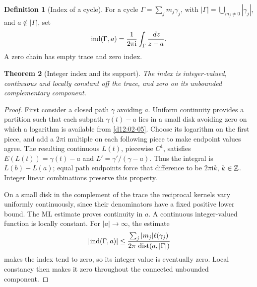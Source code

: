 \documentclass[11pt,a4paper,openany]{book}
\newtheorem{theorem}{Theorem}[chapter]
\theoremstyle{definition}
\newtheorem{definition}[theorem]{Definition}
\theoremstyle{remark}\newtheorem{remark}[theorem]{Remark}
\newcommand{\dd}{\,d}\newcommand{\iu}{\mathrm i}
\DeclareMathOperator{\dist}{dist}\DeclareMathOperator{\ord}{ord}
\newcommand{\family}[1]{}
\begin{document}
\begin{definition}[Index of a cycle]\family{D12.04.03}\label{d12:04-03}
For a cycle \(\Gamma=\sum_jm_j\gamma_j\), with
\(|\Gamma|=\bigcup_{m_j\ne0}|\gamma_j|\), and \(a\notin|\Gamma|\), set
\[
 \ind(\Gamma,a)=\frac1{2\pi\iu}\int_\Gamma\frac{\dd z}{z-a}.
\]
A zero chain has empty trace and zero index.
\end{definition}
\begin{theorem}[Integer index and its support]\label{d12:04-03-properties}
The index is integer-valued, continuous and locally constant off the
trace, and zero on its unbounded complementary component.
\end{theorem}
\begin{proof}
First consider a closed path \(\gamma\) avoiding \(a\).
Uniform continuity provides a partition such that each subpath
\(\gamma(t)-a\) lies in a small disk avoiding zero on which a logarithm
is available from \cref{d12:02-05}. Choose its logarithm on the first
piece, and add a \(2\pi\iu\) multiple on each following piece to make
endpoint values agree. The resulting continuous \(L(t)\), piecewise
\(C^1\), satisfies
\(E(L(t))=\gamma(t)-a\) and \(L'=\gamma'/(\gamma-a)\).
Thus the integral is \(L(b)-L(a)\); equal path endpoints force that
difference to be \(2\pi\iu k\), \(k\in\mathbb Z\).
Integer linear combinations preserve this property.

On a small disk in the complement of the trace the reciprocal kernels
vary uniformly continuously, since their denominators have a fixed
positive lower bound. The ML estimate proves continuity in \(a\).
A continuous integer-valued function is locally constant.
For \(|a|\to\infty\), the estimate
\[
 |\ind(\Gamma,a)|\le
 \frac{\sum_j|m_j|\ell(\gamma_j)}
 {2\pi\,\dist(a,|\Gamma|)}
\]
makes the index tend to zero, so its integer value is eventually zero.
Local constancy then makes it zero throughout the connected unbounded
component.
\end{proof}
\end{document}

